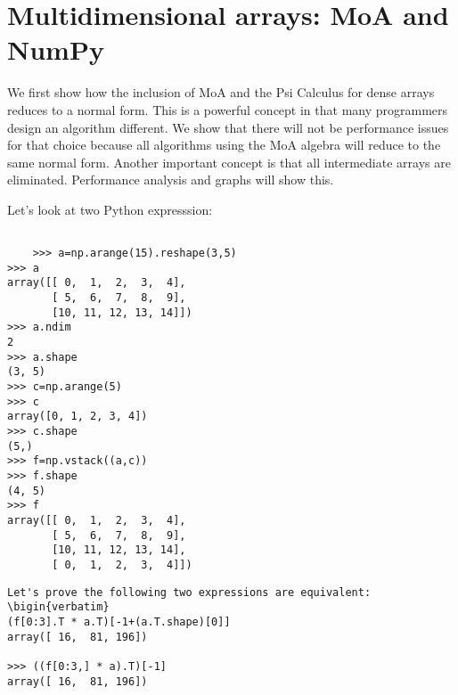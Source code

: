 {\section{Multidimensional arrays: MoA and NumPy}
We first show how the inclusion of MoA and the Psi Calculus for dense arrays
reduces to a normal form. This is a powerful concept in that many programmers design an algorithm different. We show that there will not be performance issues for that choice because all algorithms using the MoA algebra will reduce to the same normal form. Another important concept is that all intermediate arrays are eliminated. Performance analysis and graphs will show this.

Let's look at two Python expresssion:
\begin{verbatim}
   
    >>> a=np.arange(15).reshape(3,5)
>>> a
array([[ 0,  1,  2,  3,  4],
       [ 5,  6,  7,  8,  9],
       [10, 11, 12, 13, 14]])
>>> a.ndim
2
>>> a.shape
(3, 5)
>>> c=np.arange(5)
>>> c
array([0, 1, 2, 3, 4])
>>> c.shape
(5,)
>>> f=np.vstack((a,c))
>>> f.shape
(4, 5)
>>> f
array([[ 0,  1,  2,  3,  4],
       [ 5,  6,  7,  8,  9],
       [10, 11, 12, 13, 14],
       [ 0,  1,  2,  3,  4]])
       \end{verbatim}
       \begin{verbatim}
Let's prove the following two expressions are equivalent:
\bigin{verbatim}
(f[0:3].T * a.T)[-1+(a.T.shape)[0]]
array([ 16,  81, 196])

>>> ((f[0:3,] * a).T)[-1]
array([ 16,  81, 196])
\end{verbatim}

}
